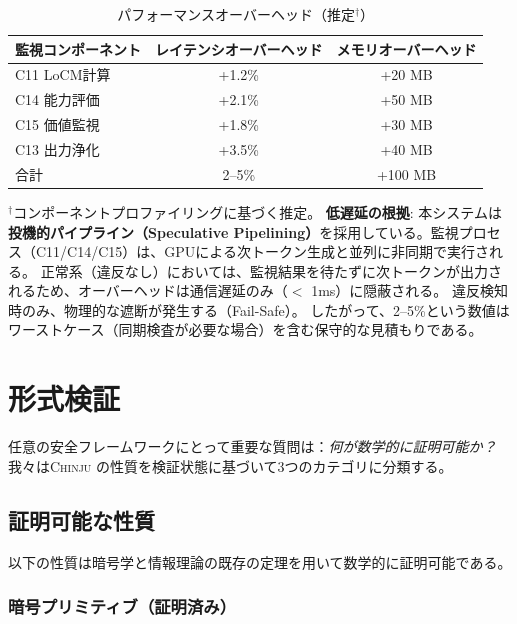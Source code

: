 \documentclass[11pt,a4paper]{article}
\newcommand{\chinju}{\textsc{Chinju}}
\begin{document}
\begin{table}[htbp]
\centering
\caption{パフォーマンスオーバーヘッド（推定$^\dagger$）}
\label{tab:performance}
\begin{tabular}{@{}lcc@{}}
\toprule
監視コンポーネント & レイテンシオーバーヘッド & メモリオーバーヘッド \\
\midrule
C11 LoCM計算 & +1.2\% & +20 MB \\
C14 能力評価 & +2.1\% & +50 MB \\
C15 価値監視 & +1.8\% & +30 MB \\
C13 出力浄化 & +3.5\% & +40 MB \\
\midrule
合計 & 2--5\% & +100 MB \\
\bottomrule
\end{tabular}

\smallskip
\noindent $^\dagger$コンポーネントプロファイリングに基づく推定。
\textbf{低遅延の根拠}: 本システムは\textbf{投機的パイプライン（Speculative Pipelining）}を採用している。監視プロセス（C11/C14/C15）は、GPUによる次トークン生成と並列に非同期で実行される。
正常系（違反なし）においては、監視結果を待たずに次トークンが出力されるため、オーバーヘッドは通信遅延のみ（$<$ 1ms）に隠蔽される。
違反検知時のみ、物理的な遮断が発生する（Fail-Safe）。
したがって、2--5\%という数値はワーストケース（同期検査が必要な場合）を含む保守的な見積もりである。
\end{table}

\section{形式検証}
\label{sec:formal}

任意の安全フレームワークにとって重要な質問は：\emph{何が数学的に証明可能か？}
我々は\chinju{} の性質を検証状態に基づいて3つのカテゴリに分類する。

\subsection{証明可能な性質}

以下の性質は暗号学と情報理論の既存の定理を用いて数学的に証明可能である。

\subsubsection{暗号プリミティブ（証明済み）}
\end{document}
